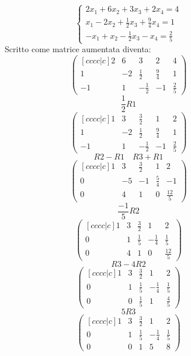 \documentclass[a4paper]{article}
\theoremstyle{break}
\theoremstyle{break}
\theoremstyle{break}
\theoremstyle{break}
\begin{document}
\begin{figure}[H]
	\begin{example}
		\[
			\begin{cases}
				2x_1 + 6x_2 + 3x_3 + 2x_4 = 4                    \\
				x_1 - 2x_2 + \frac{1}{2}x_3 + \frac{9}{4}x_4 = 1 \\
				-x_1 + x_2 - \frac{1}{2}x_3 - x_4 = \frac{2}{5}
			\end{cases}
		\]
		Scritto come matrice aumentata diventa:
		\[
			\begin{pmatrix}[cccc|c]
				2  & 6  & 3            & 2           & 4           \\
				1  & -2 & \frac{1}{2}  & \frac{9}{4} & 1           \\
				-1 & 1  & -\frac{1}{2} & -1          & \frac{2}{5}
			\end{pmatrix}
		\]
		\[
			\frac{1}{2}R1
		\]
		\[
			\begin{pmatrix}[cccc|c]
				1  & 3  & \frac{3}{2}  & 1           & 2           \\
				1  & -2 & \frac{1}{2}  & \frac{9}{4} & 1           \\
				-1 & 1  & -\frac{1}{2} & -1          & \frac{2}{5}
			\end{pmatrix}
		\]
		\[
			R2 - R1 \quad R3 + R1
		\]
		\[
			\begin{pmatrix}[cccc|c]
				1 & 3  & \frac{3}{2} & 1           & 2            \\
				0 & -5 & -1          & \frac{5}{4} & -1           \\
				0 & 4  & 1           & 0           & \frac{12}{5}
			\end{pmatrix}
		\]
		\[
			\frac{-1}{5}R2
		\]
		\[
			\begin{pmatrix}[cccc|c]
				1 & 3 & \frac{3}{2} & 1            & 2            \\
				0 & 1 & \frac{1}{5} & -\frac{1}{4} & \frac{1}{5}  \\
				0 & 4 & 1           & 0            & \frac{12}{5}
			\end{pmatrix}
		\]
		\[
			R3 - 4R2
		\]
		\[
			\begin{pmatrix}[cccc|c]
				1 & 3 & \frac{3}{2} & 1            & 2           \\
				0 & 1 & \frac{1}{5} & -\frac{1}{4} & \frac{1}{5} \\
				0 & 0 & \frac{1}{5} & 1            & \frac{4}{5}
			\end{pmatrix}
		\]
		\[
			5R3
		\]
		\[
			\begin{pmatrix}[cccc|c]
				1 & 3 & \frac{3}{2} & 1            & 2           \\
				0 & 1 & \frac{1}{5} & -\frac{1}{4} & \frac{1}{5} \\
				0 & 0 & 1           & 5            & 8
			\end{pmatrix}
		\]
	\end{example}
\end{figure}
\end{document}
